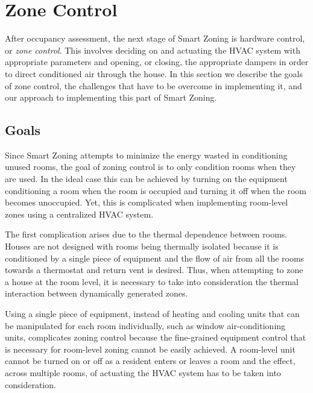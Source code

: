 \chapter{Zone Control}
\label{sec:zoneControl}

After occupancy assessment, the next stage of Smart Zoning is hardware control,
or {\em zone control}. This involves deciding on and actuating the HVAC system
with appropriate parameters and opening, or closing, the appropriate dampers in
order to direct conditioned air through the house. In this section we describe
the goals of zone control, the challenges that have to be overcome in
implementing it, and our approach to implementing this part of Smart Zoning. 

\section{Goals}
\label{sec:zoneControlGoals}


Since Smart Zoning attempts to minimize the energy wasted in conditioning unused
rooms, the goal of zoning control is to only condition rooms when they are
used. In the ideal case this can be achieved by turning on the equipment
conditioning a room when the room is occupied and turning it off when the room
becomes unoccupied. Yet, this is complicated when implementing room-level zones
using a centralized HVAC system. 


The first complication arises due to the thermal dependence between
rooms. Houses are not designed with rooms being thermally isolated because it is
conditioned by a single piece of equipment and the flow of air from all the
rooms towards a thermostat and return vent is desired. Thus, when attempting to
zone a house at the room level, it is necessary to take into consideration the
thermal interaction between dynamically generated zones.
 

Using a single piece of equipment, instead of heating and cooling units that can
be manipulated for each room individually, such as window air-conditioning
units, complicates zoning control because the fine-grained equipment control
that is necessary for room-level zoning cannot be easily achieved. A room-level
unit cannot be turned on or off as a resident enters or leaves a room and the
effect, across multiple rooms, of actuating the HVAC system has to be taken into
consideration. 

